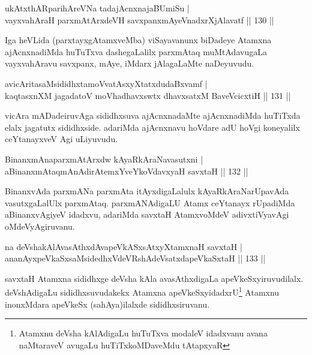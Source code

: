 \begin{shl}
ukAtxthARparihAreVNa tadajAcnxnajaBUmiSu |\\
vayxvahAraH parxmAtArxdeVH savxpanxmAyeVnadxrXjAlavatf \hfill || 130 ||
\end{shl}

\begin{artha}%
Iga heVLida (parxtayxgAtamxveMba) viSayavanunx biDadeye Atamxna ajAcnxnadiMda huTuTxva dashegaLalilx parxmAtaq muMtAdavugaLa vayxvahAravu savxpanx, mAye, iMdarx jAlagaLaMte naDeyuvudu.
\end{artha}

\begin{shl}
avicAritasaMsididhxtamoVvatAsxyXtatxdudaBxvamf |\\
kaqtasxnXM jagadatoV moVhadhavxswtx dhavxsatxM BaveVcicxtiH \hfill || 131 ||
\end{shl}

\begin{artha}
vicAra mADadeiruvAga sididhxsuva ajAcnxnadaMte ajAcnxnadiMda huTiTxda elalx jagatutx sididhxside. adariMda ajAcnxnavu hoVdare adU hoVgi koneyalilx ceYtanayxveV Agi uLiyuvudu.
\end{artha}

\begin{shl}
BinanxmAnaparxmAtArxdw kAyaRkAraNavasutxni |\\
aBinanxmAtaqmAnAdirAtemxYveYkoV\s davxyaH savxtaH \hfill || 132 ||
\end{shl}

\begin{artha}
BinanxvAda parxmANa parxmAta itAyxdigaLalulx kAyaRkAraNarUpavAda vasutxgaLalUlx parxmAtaq. parxmANAdigaLU Atamx ceYtanayx rUpadiMda aBinanxvAgiyeV idadxvu, adariMda savxtaH AtamxvoMdeV adivxtiVyavAgi oMdeVyAgiruvanu.
\end{artha}


\begin{shl}
na deVshakAlAvasAthxdAvapeVkASx\s sAtxyXtamxnaH  savxtaH |\\
ananAyxpeVkaSxsaMsidedhxVdeVRshAdeVsatxdapeVkaSxtaH \hfill || 133 ||
\end{shl}

\begin{artha}
savxtaH Atamxna sididhxge deVsha kAla avasAthxdigaLa apeVkeSxyiruvudilalx. deVshAdigaLu sididhxsuvudakekx Atamxna apeVkeSxyidadxrU\footnote{Atamxnu deVsha kAlAdigaLu huTuTxva modaleV idadxvanu avana naMtaraveV avugaLu huTiTxkoMDaveMdu tAtapxyaR} Atamxnu inonxMdara apeVkeSx (sahAya)ilalxde sididhxsiruvanu.
\end{artha}

